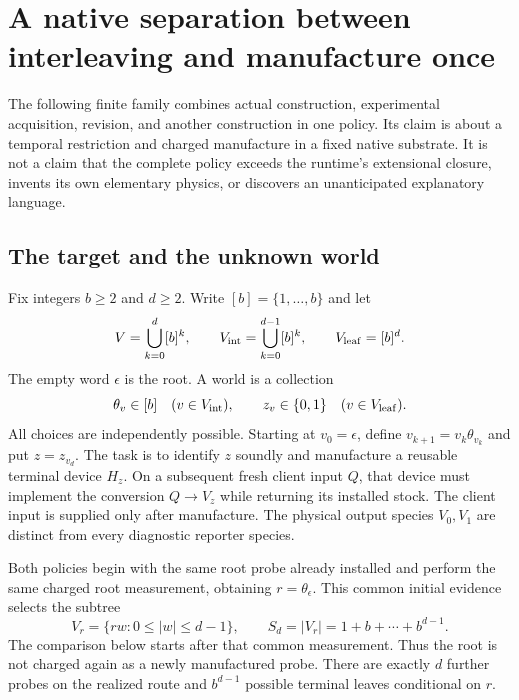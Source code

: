 \documentclass[11pt]{article}
\theoremstyle{definition}
\theoremstyle{remark}
\begin{document}
\section{A native separation between interleaving and manufacture once}
\label{ing:section}

The following finite family combines actual construction, experimental
acquisition, revision, and another construction in one policy. Its claim
is about a temporal restriction and charged manufacture in a fixed native
substrate. It is not a claim that the complete policy exceeds the runtime's
extensional closure, invents its own elementary physics, or discovers an
unanticipated explanatory language.

\subsection{The target and the unknown world}
Fix integers $b\geq2$ and $d\geq2$. Write $[b]=\{1,\ldots,b\}$ and let
\[
 V=\bigcup_{k=0}^{d}[b]^k,
 \qquad V_{\rm int}=\bigcup_{k=0}^{d-1}[b]^k,
 \qquad V_{\rm leaf}=[b]^d.
\]
The empty word $\epsilon$ is the root. A world is a collection
\[
 \theta_v\in[b]\quad(v\in V_{\rm int}),
 \qquad z_v\in\{0,1\}\quad(v\in V_{\rm leaf}).
\]
All choices are independently possible. Starting at $v_0=\epsilon$,
define $v_{k+1}=v_k\theta_{v_k}$ and put $z=z_{v_d}$. The task is to
identify $z$ soundly and manufacture a reusable terminal device $H_z$.
On a subsequent fresh client input $Q$, that device must implement the
conversion $Q\to V_z$ while returning its installed stock. The client
input is supplied only after manufacture. The physical output species
$V_0,V_1$ are distinct from every diagnostic reporter species.

Both policies begin with the same root probe already installed and perform
the same charged root measurement, obtaining $r=\theta_\epsilon$.
This common initial evidence selects the subtree
\[
 V_r=\{rw:0\leq |w|\leq d-1\},
 \qquad S_d=|V_r|=1+b+\cdots+b^{d-1}.
\]
The comparison below starts after that common measurement. Thus the root
is not charged again as a newly manufactured probe. There are exactly $d$
further probes on the realized route and $b^{d-1}$ possible terminal leaves
conditional on $r$.
\end{document}
